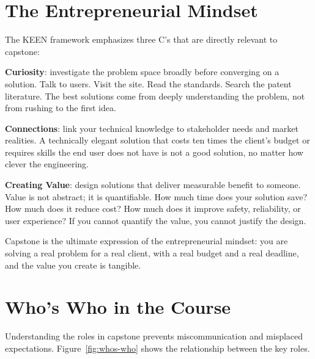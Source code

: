 \section{The Entrepreneurial Mindset}
The KEEN framework emphasizes three C's that are directly relevant to capstone:

\textbf{Curiosity}: investigate the problem space broadly before converging on a solution. Talk to users. Visit the site. Read the standards. Search the patent literature. The best solutions come from deeply understanding the problem, not from rushing to the first idea.

\textbf{Connections}: link your technical knowledge to stakeholder needs and market realities. A technically elegant solution that costs ten times the client's budget or requires skills the end user does not have is not a good solution, no matter how clever the engineering.

\textbf{Creating Value}: design solutions that deliver measurable benefit to someone. Value is not abstract; it is quantifiable. How much time does your solution save? How much does it reduce cost? How much does it improve safety, reliability, or user experience? If you cannot quantify the value, you cannot justify the design.

Capstone is the ultimate expression of the entrepreneurial mindset: you are solving a real problem for a real client, with a real budget and a real deadline, and the value you create is tangible.


\section{Who's Who in the Course}
Understanding the roles in capstone prevents miscommunication and misplaced expectations. Figure~\ref{fig:whos-who} shows the relationship between the key roles.

